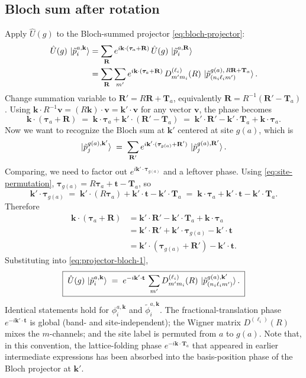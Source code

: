 \documentclass[11pt,a4paper]{article}
\newcommand{\kk}{\mathbf{k}}
\newcommand{\RR}{\mathbf{R}}
\newcommand{\TT}{\mathbf{T}}
\newcommand{\tautau}{\boldsymbol{\tau}}
\newcommand{\tvec}{\mathbf{t}}
\newcommand{\Uhat}{\hat{U}}
\begin{document}
\subsection{Bloch sum after rotation}

Apply $\Uhat(g)$ to the Bloch-summed projector \eqref{eq:bloch-projector}:
\begin{align}
\Uhat(g)\,\ket{\tilde p_i^{a,\kk}}
  &= \sum_{\RR} e^{i\kk\cdot(\tautau_a + \RR)}\,\Uhat(g)\,\ket{\tilde p_i^{a,\RR}} \nonumber\\
  &= \sum_{\RR}\sum_{m'} e^{i\kk\cdot(\tautau_a + \RR)}\,
     D^{(\ell_i)}_{m' m_i}(R)\,
     \ket{\tilde p_{(n_i\ell_i m')}^{g(a),\,R\RR + \TT_a}}.
\label{eq:projector-bloch-1}
\end{align}
Change summation variable to $\RR' = R\RR + \TT_a$, equivalently
$\RR = R^{-1}(\RR' - \TT_a)$. Using
$\kk\cdot R^{-1}\mathbf{v} = (R\kk)\cdot\mathbf{v} = \kk'\cdot\mathbf{v}$ for
any vector $\mathbf{v}$, the phase becomes
\begin{equation}
\kk\cdot(\tautau_a + \RR)
  \;=\; \kk\cdot\tautau_a + \kk'\cdot(\RR' - \TT_a)
  \;=\; \kk'\cdot\RR' - \kk'\cdot\TT_a + \kk\cdot\tautau_a.
\end{equation}
Now we want to recognize the Bloch sum at $\kk'$ centered at site $g(a)$,
which is
\begin{equation}
\ket{\tilde p_j^{g(a),\kk'}}
  \;=\; \sum_{\RR'} e^{i\kk'\cdot(\tautau_{g(a)} + \RR')}\,\ket{\tilde p_j^{g(a),\RR'}}.
\end{equation}
Comparing, we need to factor out $e^{i\kk'\cdot\tautau_{g(a)}}$ and a leftover
phase. Using \eqref{eq:site-permutation}, $\tautau_{g(a)} = R\tautau_a + \tvec - \TT_a$,
so
\begin{equation}
\kk'\cdot\tautau_{g(a)} \;=\; \kk'\cdot(R\tautau_a) + \kk'\cdot\tvec - \kk'\cdot\TT_a
  \;=\; \kk\cdot\tautau_a + \kk'\cdot\tvec - \kk'\cdot\TT_a.
\end{equation}
Therefore
\begin{align}
\kk\cdot(\tautau_a + \RR)
  &= \kk'\cdot\RR' - \kk'\cdot\TT_a + \kk\cdot\tautau_a \nonumber\\
  &= \kk'\cdot\RR' + \kk'\cdot\tautau_{g(a)} - \kk'\cdot\tvec \nonumber\\
  &= \kk'\cdot(\tautau_{g(a)} + \RR') - \kk'\cdot\tvec.
\end{align}
Substituting into \eqref{eq:projector-bloch-1},
\begin{equation}
\boxed{\;\Uhat(g)\,\ket{\tilde p_i^{a,\kk}}
  \;=\; e^{-i\kk'\cdot\tvec}\,\sum_{m'} D^{(\ell_i)}_{m' m_i}(R)\,
        \ket{\tilde p_{(n_i\ell_i m')}^{g(a),\kk'}}.\;}
\label{eq:projector-bloch-symm}
\end{equation}
Identical statements hold for $\phi_i^{a,\kk}$ and $\tilde\phi_i^{a,\kk}$.
The fractional-translation phase $e^{-i\kk'\cdot\tvec}$ is global (band- and
site-independent); the Wigner matrix $D^{(\ell_i)}(R)$ mixes the $m$-channels;
and the site label is permuted from $a$ to $g(a)$. Note that, in this
convention, the lattice-folding phase $e^{-i\kk\cdot\TT_a}$ that appeared in
earlier intermediate expressions has been absorbed into the basis-position
phase of the Bloch projector at $\kk'$.
\end{document}
